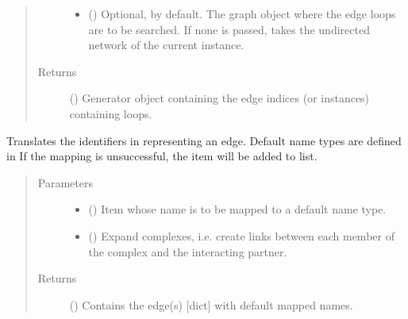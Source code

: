 \documentclass[letterpaper,10pt,english]{sphinxmanual}
\begin{document}
\begin{fulllineitems}
\begin{fulllineitems}
\begin{quote}
\begin{description}
\begin{itemize}
\item {} 
 () \textendash{} Optional,  by default. The graph object where the
edge loops are to be searched. If none is passed, takes the
undirected network of the current instance.

\end{itemize}

\item[{Returns}] \leavevmode
() \textendash{} Generator object containing the edge
indices (or instances) containing loops.

\end{description}\end{quote}

\end{fulllineitems}


\begin{fulllineitems}
\label{\detokenize{reference:pypath.main.PyPath.map_edge}}
Translates the identifiers in  representing an edge. Default
name types are defined in
 If the mapping
is unsuccessful, the item will be added to
 list.
\begin{quote}\begin{description}
\item[{Parameters}] \leavevmode\begin{itemize}
\item {} 
 () \textendash{} Item whose name is to be mapped to a default name type.

\item {} 
 () \textendash{} Expand complexes, i.e. create links between each member of
the complex and the interacting partner.

\end{itemize}

\item[{Returns}] \leavevmode
() \textendash{} Contains the edge(s) {[}dict{]} with default mapped
names.


\end{description}
\end{quote}
\end{fulllineitems}
\end{fulllineitems}
\end{document}
